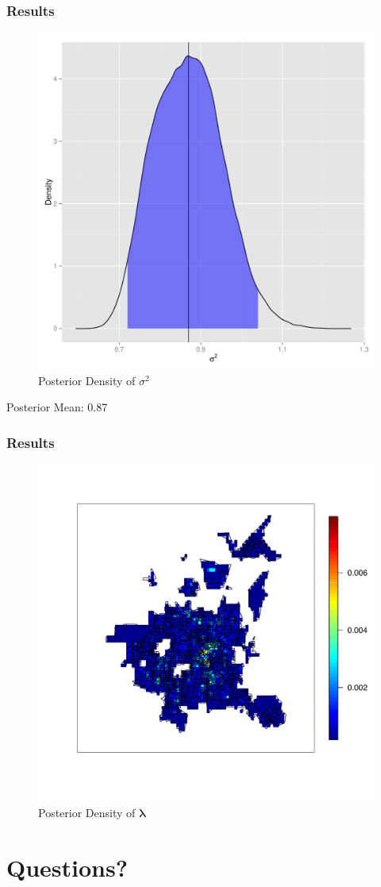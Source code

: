 \documentclass[10pt, compress]{beamer}
\begin{document}
  \begin{frame}
    \frametitle{Results}
    \centering
    \begin{figure}
      \caption{Posterior Density of $\sigma^2$}
      \includegraphics[height=0.625\textheight]{s2_density.pdf}
    \end{figure}
    Posterior Mean: 0.87
  \end{frame}
  \begin{frame}
    \frametitle{Results}
   \centering
    \begin{figure}
      \caption{Posterior Density of $\boldsymbol\lambda$}
      \includegraphics[height=0.7\textheight]{posteriorLocationDensity.pdf}
    \end{figure}
  \end{frame}
  \section{Questions?}
\end{document}
